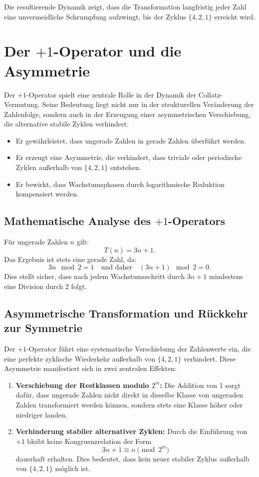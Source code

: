 \documentclass[a4paper,12pt]{article}
\begin{document}
Die resultierende Dynamik zeigt, dass die Transformation langfristig jeder Zahl eine unvermeidliche Schrumpfung aufzwingt, bis der Zyklus \( \{4, 2, 1\} \) erreicht wird.


\section{Der \(+1\)-Operator und die Asymmetrie}
Der \(+1\)-Operator spielt eine zentrale Rolle in der Dynamik der Collatz-Vermutung. Seine Bedeutung liegt nicht nur in der strukturellen Veränderung der Zahlenfolge, sondern auch in der Erzeugung einer asymmetrischen Verschiebung, die alternative stabile Zyklen verhindert.

\begin{itemize}
    \item Er gewährleistet, dass ungerade Zahlen in gerade Zahlen überführt werden.
    \item Er erzeugt eine Asymmetrie, die verhindert, dass triviale oder periodische Zyklen außerhalb von \( \{4, 2, 1\} \) entstehen.
    \item Er bewirkt, dass Wachstumsphasen durch logarithmische Reduktion kompensiert werden.
\end{itemize}

\subsection{Mathematische Analyse des \(+1\)-Operators}
Für ungerade Zahlen \( n \) gilt:
\[
T(n) = 3n + 1.
\]
Das Ergebnis ist stets eine gerade Zahl, da:
\[
3n \mod 2 = 1 \quad \text{und daher} \quad (3n + 1) \mod 2 = 0.
\]
Dies stellt sicher, dass nach jedem Wachstumsschritt durch \( 3n + 1 \) mindestens eine Division durch 2 folgt.

\subsection{Asymmetrische Transformation und Rückkehr zur Symmetrie}
Der \(+1\)-Operator führt eine systematische Verschiebung der Zahlenwerte ein, die eine perfekte zyklische Wiederkehr außerhalb von \( \{4, 2, 1\} \) verhindert. Diese Asymmetrie manifestiert sich in zwei zentralen Effekten:

\begin{enumerate}
    \item \textbf{Verschiebung der Restklassen modulo \( 2^m \):}  
    Die Addition von 1 sorgt dafür, dass ungerade Zahlen nicht direkt in dieselbe Klasse von ungeraden Zahlen transformiert werden können, sondern stets eine Klasse höher oder niedriger landen.
    \item \textbf{Verhinderung stabiler alternativer Zyklen:}  
    Durch die Einführung von \( +1 \) bleibt keine Kongruenzrelation der Form
    \[
    3n + 1 \equiv n \pmod{2^m}
    \]
    dauerhaft erhalten. Dies bedeutet, dass kein neuer stabiler Zyklus außerhalb von \( \{4,2,1\} \) möglich ist.
\end{enumerate}
\end{document}
